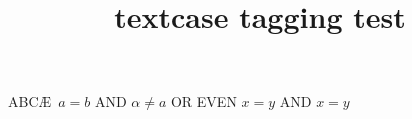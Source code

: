 \documentclass{article}
\title{textcase tagging test}
\begin{document}
\MakeTextUppercase{abc\ae\ \( a = b \) and $\alpha \neq a$
or even \ensuremath{x=y} and $\ensuremath{x=y}$}
\end{document}
